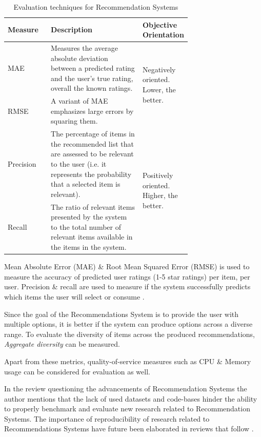 \documentclass[manuscript,screen,review]{acmart}
\begin{document}
\begin{table}[h]
\caption{Evaluation techniques for Recommendation Systems}
\label{tab:evaluation-techniques-table}
\centering
\begin{tabular}{|l|p{0.5\linewidth}|p{0.21\linewidth}|} 
\hline
Measure & Description & Objective Orientation \\ 
\hline
MAE & Measures the average absolute deviation between a predicted rating and the user’s true rating, overall the known ratings. & \multirow{2}{=}{Negatively oriented. Lower, the better.} \\ 
\cline{1-2}
RMSE & A variant of MAE emphasizes large errors by squaring them. &  \\ 
\hline
Precision & The percentage of items in the recommended list that are assessed to be relevant to the user (i.e. it represents the probability that a selected item is relevant). & \multirow{2}{=}{Positively oriented. Higher, the better.} \\ 
\cline{1-2}
Recall & The ratio of relevant items presented by the system to the total number of relevant items available in the items in the system. &  \\
\hline
\end{tabular}
\end{table}

Mean Absolute Error (MAE) \& Root Mean Squared Error (RMSE) is used to measure the accuracy of predicted user ratings (1-5 star ratings) per item, per user. Precision \& recall are used to measure if the system successfully predicts which items the user will select or consume \cite{dayan_recommenders_2011}.


Since the goal of the Recommendations System is to provide the user with multiple options, it is better if the system can produce options across a diverse range. To evaluate the diversity of items across the produced recommendations, \textit{Aggregate diversity} can be measured.

Apart from these metrics, quality-of-service measures such as CPU \& Memory usage can be considered for evaluation as well. 


In the review questioning the advancements of Recommendation Systems \cite{dacrema_are_2019} the author mentions that the lack of used datasets and code-bases hinder the ability to properly benchmark and evaluate new research related to Recommendation Systems. The importance of reproducibility of research related to Recommendations Systems have future been elaborated in reviews that follow \cite{dacrema_troubling_2021, ferrari_dacrema_critically_2020, dacrema_methodological_2020}.
\end{document}
